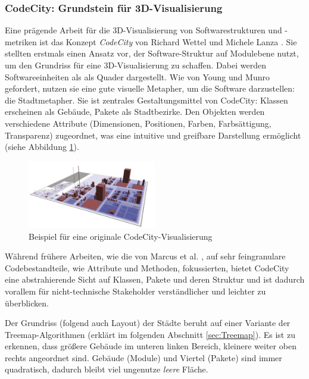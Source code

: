 \subsubsection{CodeCity: Grundstein für 3D-Visualisierung}
\label{sec:CodeCity}

Eine prägende Arbeit für die 3D-Visualisierung von Softwarestrukturen und -metriken ist das Konzept \textit{CodeCity} von Richard Wettel und Michele Lanza \cite{codeCity1}. Sie stellten erstmals einen Ansatz vor, der Software-Struktur auf Modulebene nutzt, um den Grundriss für eine 3D-Visualisierung zu schaffen. Dabei werden Softwareeinheiten als als Quader dargestellt. Wie von Young und Munro \cite{visSoftwareVR} gefordert, nutzen sie eine gute visuelle Metapher, um die Software darzustellen: die Stadtmetapher. Sie ist zentrales Gestaltungsmittel von CodeCity: Klassen erscheinen als Gebäude, Pakete als Stadtbezirke. Den Objekten werden verschiedene Attribute (Dimensionen, Positionen, Farben, Farbsättigung, Transparenz) zugeordnet, was eine intuitive und greifbare Darstellung ermöglicht (siehe Abbildung \ref{fig:codeCity}).

\begin{figure}
    \centering
    \includegraphics[width=0.5\textwidth]{images/codeCityExample.png}
    \caption{Beispiel für eine originale CodeCity-Visualisierung~\cite[2]{codeCity1}}
    \label{fig:codeCity}
\end{figure}

Während frühere Arbeiten, wie die von Marcus et al. \cite{3dsoftwareMarcus}, auf sehr feingranulare Codebestandteile, wie Attribute und Methoden, fokussierten, bietet CodeCity eine abstrahierende Sicht auf Klassen, Pakete und deren Struktur und ist dadurch vorallem für nicht-technische Stakeholder verständlicher und leichter zu überblicken.

Der Grundriss (folgend auch Layout) der Städte beruht auf einer Variante der Treemap-Algorithmen (erklärt im folgenden Abschnitt \ref{sec:Treemap}). Es ist zu erkennen, dass größere Gebäude im unteren linken Bereich, kleinere weiter oben rechts angeordnet sind. Gebäude (Module) und Viertel (Pakete) sind immer quadratisch, dadurch bleibt viel ungenutze \textit{leere} Fläche. 

